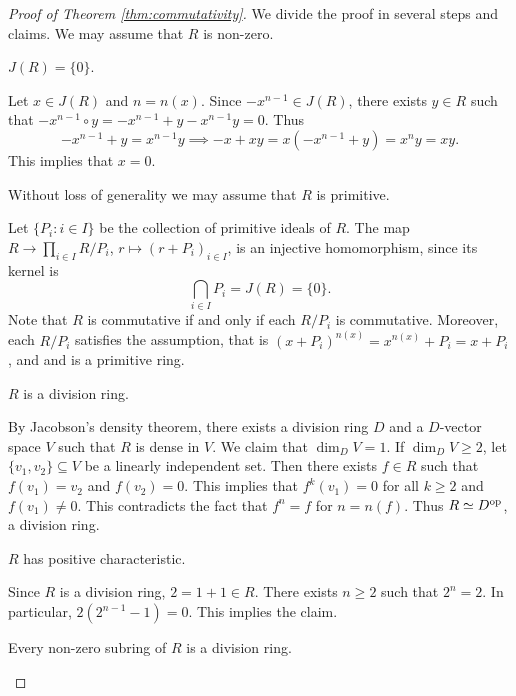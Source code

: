 \begin{proof}[Proof of Theorem \ref{thm:commutativity}]
    We divide the proof in several steps and claims. We may assume that 
    $R$ is non-zero. 
    
    \begin{claim}
        $J(R)=\{0\}$. 
    \end{claim}
    
    Let $x\in J(R)$ and $n=n(x)$. Since $-x^{n-1}\in J(R)$, 
    there exists $y\in R$ such that $-x^{n-1}\circ y=-x^{n-1}+y-x^{n-1}y=0$. Thus
    \[
    -x^{n-1}+y=x^{n-1}y\implies
    -x+xy=x(-x^{n-1}+y)=x^ny=xy.
    \]
    This implies that $x=0$.
    
    \begin{claim}
        Without loss of generality we may assume that $R$ is primitive. 
    \end{claim}
	
	Let $\{P_i:i\in I\}$ be the collection of primitive ideals of $R$. 
	The map 
	$R\to \prod_{i\in I}R/P_i$, $r\mapsto (r+P_i)_{i\in I}$, 
	is an injective homomorphism, since
	its kernel is 
	\[
	\bigcap_{i\in I} P_i=J(R)=\{0\}.
	\]
	Note that
	$R$ is commutative if and only if each $R/P_i$ is commutative. Moreover, 
	each $R/P_i$ 
	satisfies the assumption, that is 
	$(x+P_i)^{n(x)}=x^{n(x)}+P_i=x+P_i$, and 
	and is a primitive ring. 
	
    \begin{claim}
        $R$ is a division ring. 
    \end{claim}

    By Jacobson's density theorem,
    there exists a division ring $D$ and 
    a $D$-vector space $V$ such that 
    $R$ is dense in $V$. We claim that $\dim_DV=1$. If $\dim_DV\geq 2$, 
    let $\{v_1,v_2\}\subseteq V$ be a linearly independent set. Then
    there exists $f\in R$ such that $f(v_1)=v_2$ and $f(v_2)=0$. This implies
    that $f^{k}(v_1)=0$ for all $k\geq 2$ and $f(v_1)\ne 0$. This contradicts
    the fact that $f^{n}=f$ for $n=n(f)$. Thus $R\simeq D^{\operatorname{op}}$, 
    a division ring. 
    
    \begin{claim}
        $R$ has positive characteristic. 
    \end{claim}

    Since $R$ is a division ring, $2=1+1\in R$. There exists $n\geq2$ 
    such that $2^n=2$. In particular, 
    $2(2^{n-1}-1)=0$. This implies the claim. 
    
    \begin{claim}
        Every non-zero subring of $R$ is a division ring. 
    \end{claim}
    

\end{proof}
